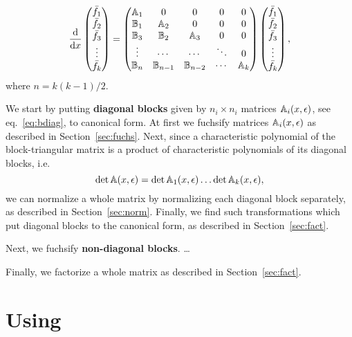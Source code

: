 \documentclass[12pt,a4paper]{article}
\def\M#1{\mathbb{#1}} %
\begin{document}
\begin{equation}
\label{eq:bdiag}
\frac{\D}{\D x}
\left(
\begin{matrix}
  \bar{f_1} \\ \bar{f_2} \\ \bar{f_3} \\ \vdots \\ \bar{f_k}
\end{matrix}
\right)
= 
\left(
\begin{matrix}
  \M A_1 & 0      & 0 & 0 & 0
\\
  \M B_1 & \M A_2 & 0 & 0 & 0
\\
  \M B_3 & \M B_2 & \M A_3 & 0 & 0
\\
  \vdots & \cdots & \cdots & \ddots & 0
\\
  \M B_n & \M B_{n-1} & \M B_{n-2} & \cdots & \M A_k
\end{matrix}
\right)
\left(
\begin{matrix}
  \bar{f_1} \\ \bar{f_2} \\ \bar{f_3} \\ \vdots \\ \bar{f_k}
\end{matrix}
\right)
,
\end{equation}
where $n=k(k-1)/2$.

We start by putting {\bf diagonal blocks} given by $n_i \times n_i$ matrices $\M A_i(x,\eps)$, see eq.~\eqref{eq:bdiag}, to canonical form.
At first we fuchsify matrices $\M A_i(x,\eps)$ as described in Section~\ref{sec:fuchs}.
Next, since a characteristic polynomial of the block-triangular matrix is a product of characteristic polynomials of its diagonal blocks, i.e.
\begin{equation}
  \det{\M A(x,\eps)} = \det{\M A_1(x,\eps)} \ldots  \det{\M A_k(x,\eps)}
  ,
\end{equation}
we can normalize a whole matrix by normalizing each diagonal block separately, as described in Section~\ref{sec:norm}.
Finally, we find such transformations which put diagonal blocks to the canonical form, as described in Section~\ref{sec:fact}.

Next, we fuchsify {\bf non-diagonal blocks}.
\ldots

Finally, we factorize a whole matrix as described in Section~\ref{sec:fact}.


\section{Using \fuchsia}
\label{sec:3}
\end{document}
